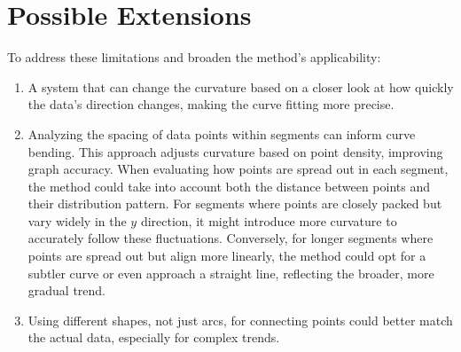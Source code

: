 \documentclass{article}
\begin{document}
\section{Possible Extensions}
To address these limitations and broaden the method's applicability:
\begin{enumerate}
    \item A system that can change the curvature based on a closer look at how quickly the data's direction changes, making the curve fitting more precise.
	\item Analyzing the spacing of data points within segments can inform curve bending. This approach adjusts curvature based on point density, improving graph accuracy. When evaluating how points are spread out in each segment, the method could take into account both the distance between points and their distribution pattern. For segments where points are closely packed but vary widely in the \(y\) direction, it might introduce more curvature to accurately follow these fluctuations. Conversely, for longer segments where points are spread out but align more linearly, the method could opt for a subtler curve or even approach a straight line, reflecting the broader, more gradual trend. 
    \item Using different shapes, not just arcs, for connecting points could better match the actual data, especially for complex trends.
\end{enumerate}
\end{document}
